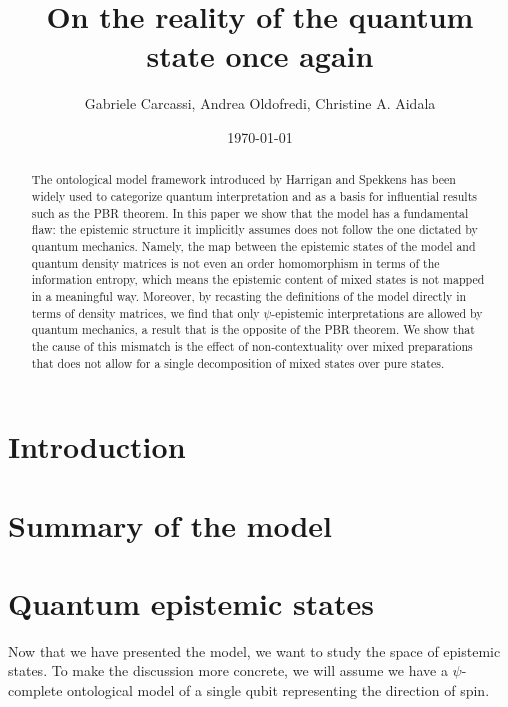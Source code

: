 \documentclass[10pt,twocolumn, nofootinbib]{revtex4-2}
\begin{document}
\title{On the reality of the quantum state once again}
\author{Gabriele Carcassi, Andrea Oldofredi, Christine A. Aidala}

\date{\today}


\begin{abstract}
The ontological model framework introduced by Harrigan and Spekkens has been widely used to categorize quantum interpretation and as a basis for influential results such as the PBR theorem. In this paper we show that the model has a fundamental flaw: the epistemic structure it implicitly assumes does not follow the one dictated by quantum mechanics. Namely, the map between the epistemic states of the model and quantum density matrices is not even an order homomorphism in terms of the information entropy, which means the epistemic content of mixed states is not mapped in a meaningful way. Moreover, by recasting the definitions of the model directly in terms of density matrices, we find that only $\psi$-epistemic interpretations are allowed by quantum mechanics, a result that is the opposite of the PBR theorem. We show that the cause of this mismatch is the effect of non-contextuality over mixed preparations that does not allow for a single decomposition of mixed states over pure states.
\end{abstract}

\maketitle

\section{Introduction}

\section{Summary of the model}

\section{Quantum epistemic states}
Now that we have presented the model, we want to study the space of epistemic states. To make the discussion more concrete, we will assume we have a $\psi$-complete ontological model of a single qubit representing the direction of spin.
\end{document}
